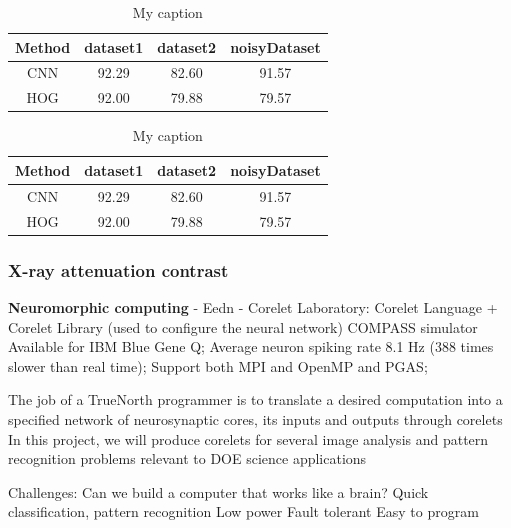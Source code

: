 \begin{table}[]
\centering
\caption{My caption}
\label{my-label}
\begin{tabular}{|c||c|c|c|}
\hline
Method & dataset1 & dataset2 & noisyDataset \\
\hline
CNN    & 92.29    & 82.60    & 91.57        \\
HOG    & 92.00    & 79.88    & 79.57        \\
\hline
\end{tabular}
\end{table}

\begin{table}[]
\centering
\caption{My caption}
\label{my-label}
\begin{tabular}{|c||c|c|c|}
\hline
Method & dataset1 & dataset2 & noisyDataset \\
\hline
CNN    & 92.29    & 82.60    & 91.57        \\
HOG    & 92.00    & 79.88    & 79.57        \\
\hline
\end{tabular}
\end{table}

\subsubsection{X-ray attenuation contrast}

\textbf{Neuromorphic computing}
- Eedn
- Corelet Laboratory: Corelet Language + Corelet Library (used to configure the neural network)
COMPASS simulator
Available for IBM Blue Gene Q;
Average neuron spiking rate 8.1 Hz (388 times slower than real time);
Support both MPI and OpenMP and PGAS;

The job of a TrueNorth programmer is to translate a desired computation into a specified network of neurosynaptic cores, its inputs and outputs through corelets
In this project, we will produce corelets for several image analysis and pattern recognition problems relevant to DOE science applications

Challenges: Can we build a computer that works like a brain?
Quick classification, pattern recognition
Low power
Fault tolerant
Easy to program




